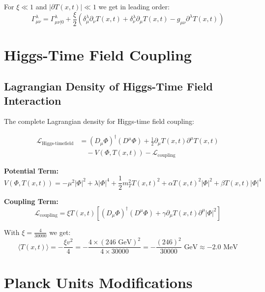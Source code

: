 \documentclass[12pt,a4paper]{report}
\newcommand{\Tfield}{T(x,t)}  %
\newcommand{\xipar}{\xi}      %
\begin{document}
	For $\xipar \ll 1$ and $|\partial \Tfield| \ll 1$ we get in leading order:
	\begin{equation}\label{eq:christoffel_leading_order}
		\Gamma^\lambda_{\mu\nu} = \Gamma^\lambda_{\mu\nu|0} + \frac{\xipar}{2} \left(\delta^\lambda_\mu \partial_\nu \Tfield + \delta^\lambda_\nu \partial_\mu \Tfield - g_{\mu\nu} \partial^\lambda \Tfield\right)
	\end{equation}
	
	\section{Higgs-Time Field Coupling}\label{sec:higgs_timefield_coupling_extended}
	
	\subsection{Lagrangian Density of Higgs-Time Field Interaction}\label{subsec:higgs_timefield_lagrangian}

The complete Lagrangian density for Higgs-time field coupling:

\begin{align}\label{eq:higgs_timefield_lagrangian_complete}
	\mathcal{L}_{\text{Higgs-timefield}} &= (D_\mu \Phi)^\dagger (D^\mu \Phi) + \frac{1}{2} \partial_\mu \Tfield \partial^\mu \Tfield \\
	&\quad - V(\Phi, \Tfield) - \mathcal{L}_{\text{coupling}}
\end{align}

\textbf{Potential Term:}
\begin{equation}
	V(\Phi, \Tfield) = -\mu^2 |\Phi|^2 + \lambda |\Phi|^4 + \frac{1}{2} m_T^2 \Tfield^2 + \alpha \Tfield^2 |\Phi|^2 + \beta \Tfield |\Phi|^4
\end{equation}

\textbf{Coupling Term:}
\begin{equation}
	\mathcal{L}_{\text{coupling}} = \xipar \Tfield \left[(D_\mu \Phi)^\dagger (D^\mu \Phi) + \gamma \partial_\mu \Tfield \partial^\mu |\Phi|^2\right]
\end{equation}

With $\xipar = \frac{4}{30000}$ we get:
\begin{equation}
	\langle \Tfield \rangle = -\frac{\xipar v^2}{4} = -\frac{4 \times (246 \text{ GeV})^2}{4 \times 30000} = -\frac{(246)^2}{30000} \text{ GeV} \approx -2.0 \text{ MeV}
\end{equation}

	\section{Planck Units Modifications}\label{sec:planck_units_modifications}
	
\end{document}
